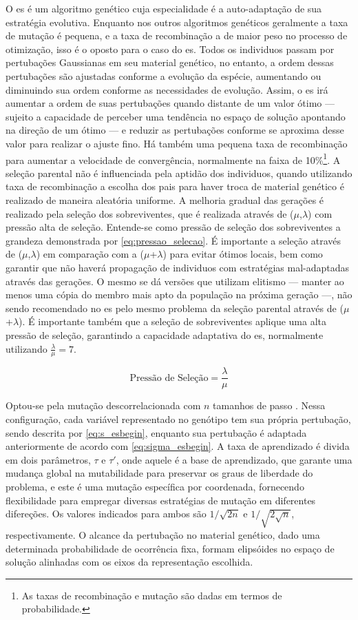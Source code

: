 O \acs{es} é um algoritmo genético cuja especialidade é a
auto-adaptação de sua estratégia evolutiva. Enquanto nos outros
algoritmos genéticos geralmente a taxa de mutação é pequena, e a taxa
de recombinação a de maior peso no processo de otimização, isso é o
oposto para o caso do \acs{es}. Todos os individuos passam por
pertubações Gaussianas em seu material genético, no entanto, a ordem
dessas pertubações são ajustadas conforme a evolução da espécie,
aumentando ou diminuindo sua ordem conforme as necessidades de
evolução. Assim, o \acs{es} irá aumentar a ordem de suas pertubações
quando distante de um valor ótimo --- sujeito a capacidade de perceber
uma tendência no espaço de solução apontando na direção de um ótimo
--- e reduzir as pertubações conforme se aproxima desse valor para
realizar o ajuste fino. Há também uma pequena taxa de recombinação
para aumentar a velocidade de convergência, normalmente na faixa de
10\%\footnote{As taxas de recombinação e mutação são dadas em termos
de probabilidade.}. A seleção parental não é influenciada pela aptidão
dos individuos, quando utilizando taxa de recombinação a escolha dos
pais para haver troca de material genético é realizado de maneira
aleatória uniforme. A melhoria gradual das gerações é realizado pela
seleção dos sobreviventes, que é realizada através de
($\mu$,$\lambda$) com pressão alta de seleção. Entende-se como pressão
de seleção dos sobreviventes a grandeza demonstrada por
\ref{eq:pressao_selecao}. É importante a seleção
através de ($\mu$,$\lambda$) em comparação com a ($\mu$+$\lambda$)
para evitar ótimos locais, bem como garantir que não haverá propagação
de individuos com estratégias mal-adaptadas através das gerações. O
mesmo se dá versões que utilizam elitismo --- manter ao menos uma
cópia do membro mais apto da população na próxima geração ---, não
sendo recomendado no \acs{es} pelo mesmo problema da seleção parental
através de ($\mu$+$\lambda$). É importante também que a seleção de
sobreviventes aplique uma alta pressão de seleção, garantindo a
capacidade adaptativa do \acs{es}, normalmente utilizando
$\frac{\lambda}{\mu}=7$.

\begin{equation}\label{eq:pressao_selecao}
\text{Pressão de Seleção} = \dfrac{\lambda}{\mu}
\end{equation}

Optou-se pela mutação descorrelacionada com $n$ tamanhos de passo
\cite[p. 76--78]{eiben2003introduction}. Nessa configuração, cada
variável representado no genótipo tem sua própria pertubação, sendo
descrita por \ref{eq:s_esbegin}, enquanto sua pertubação é adaptada
anteriormente de acordo com \ref{eq:sigma_esbegin}. A taxa de
aprendizado é divida em dois parâmetros, $\tau$ e $\tau'$, onde aquele
é a base de aprendizado, que garante uma mudança global na
mutabilidade para preservar os graus de liberdade do problema, e este
é uma mutação específica por coordenada, fornecendo flexibilidade para
empregar diversas estratégias de mutação em diferentes difereções. Os
valores indicados para ambos são $1/\sqrt{2n}$ e $1/\sqrt{2\sqrt{n}}$,
respectivamente. O alcance da pertubação no material genético, dado uma
determinada probabilidade de ocorrência fixa, formam elipsóides no
espaço de solução alinhadas com os eixos da representação escolhida. 

